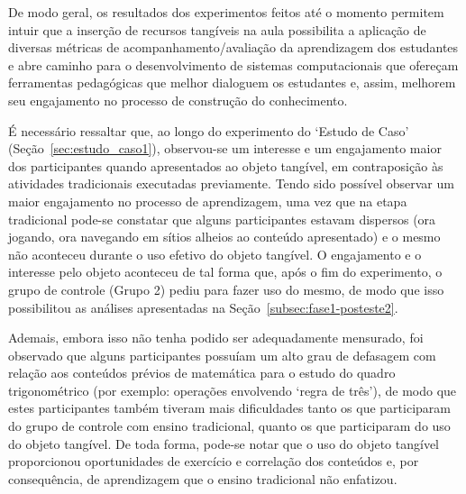 
De modo geral, os resultados dos experimentos feitos até o momento permitem intuir que a inserção de recursos tangíveis na aula possibilita a aplicação de diversas métricas de acompanhamento/avaliação da aprendizagem dos estudantes e abre caminho para o desenvolvimento de sistemas computacionais %
que ofereçam %
ferramentas pedagógicas que melhor dialoguem os estudantes e, assim, melhorem seu engajamento no processo de construção do conhecimento.

É necessário ressaltar que, ao longo do experimento do `Estudo de Caso' (Seção~\ref{sec:estudo_caso1}), observou-se um interesse e um engajamento maior dos participantes quando apresentados ao objeto tangível, em contraposição às atividades tradicionais executadas previamente. Tendo sido possível observar um maior engajamento no processo de aprendizagem, uma vez que na etapa tradicional pode-se constatar que alguns participantes estavam dispersos (ora jogando, ora navegando em sítios alheios ao conteúdo apresentado) e o mesmo não aconteceu durante o uso efetivo do objeto tangível. O engajamento e o interesse pelo objeto aconteceu de tal forma que, após o fim do experimento, o grupo de controle (Grupo 2) pediu para fazer uso do mesmo, de modo que isso possibilitou as análises apresentadas na Seção~\ref{subsec:fase1-posteste2}.

Ademais, embora isso não tenha podido ser adequadamente mensurado, foi observado que alguns participantes possuíam um alto grau de defasagem com relação aos conteúdos prévios de matemática para o estudo do quadro trigonométrico (por exemplo: operações envolvendo `regra de três'), de modo que estes participantes também tiveram mais dificuldades tanto os que participaram do grupo de controle com ensino tradicional, quanto os que participaram do uso do objeto tangível. De toda forma, pode-se notar que o uso do objeto tangível proporcionou oportunidades de exercício e correlação dos conteúdos e, por consequência, de aprendizagem que o ensino tradicional não enfatizou. 

